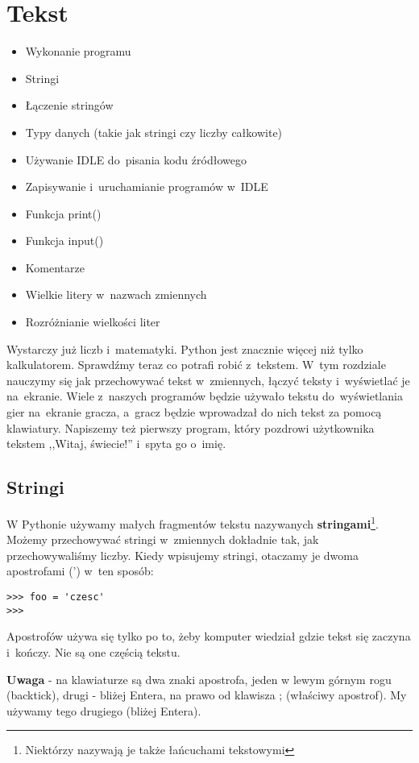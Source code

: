 \documentclass{book}
\newcommand{\btopicscovered}{
	\begin{graybox}
	\begin{itemize}
}
\newcommand{\etopicscovered}{
	\end{itemize}
	\end{graybox}
}
\begin{document}
\chapter{Tekst}

\btopicscovered
	\item Wykonanie programu
	\item Stringi
	\item Łączenie stringów
	\item Typy danych (takie jak stringi czy liczby całkowite)
	\item Używanie IDLE do~pisania kodu źródłowego
	\item Zapisywanie i~uruchamianie programów w~IDLE
	\item Funkcja print()
	\item Funkcja input()
	\item Komentarze
	\item Wielkie litery w~nazwach zmiennych
	\item Rozróżnianie wielkości liter
\etopicscovered

Wystarczy już liczb i~matematyki. Python jest znacznie więcej niż tylko kalkulatorem. Sprawdźmy teraz co potrafi robić z~tekstem. W~tym rozdziale nauczymy się jak przechowywać tekst w~zmiennych, łączyć teksty i~wyświetlać je na~ekranie. Wiele z~naszych programów będzie używało tekstu do~wyświetlania gier na~ekranie gracza, a~gracz będzie wprowadzał do nich tekst za pomocą klawiatury. Napiszemy też pierwszy program, który pozdrowi użytkownika tekstem ,,Witaj, świecie!'' i~spyta go o~imię.

\section{Stringi}

W Pythonie używamy małych fragmentów tekstu nazywanych {\bf stringami}\footnote{Niektórzy nazywają je także łańcuchami tekstowymi}. Możemy przechowywać stringi w~zmiennych dokładnie tak, jak przechowywaliśmy liczby. Kiedy wpisujemy stringi, otaczamy je dwoma apostrofami (') w~ten sposób:

\begin{lstlisting}
>>> foo = 'czesc'
>>>
\end{lstlisting}

Apostrofów używa się tylko po to, żeby komputer wiedział gdzie tekst się zaczyna i~kończy. Nie są one częścią tekstu.

{\bf Uwaga} - na klawiaturze są dwa znaki apostrofa, jeden w lewym górnym rogu (backtick), drugi - bliżej Entera, na prawo od klawisza ; (właściwy apostrof). My używamy tego drugiego (bliżej Entera).
\end{document}
